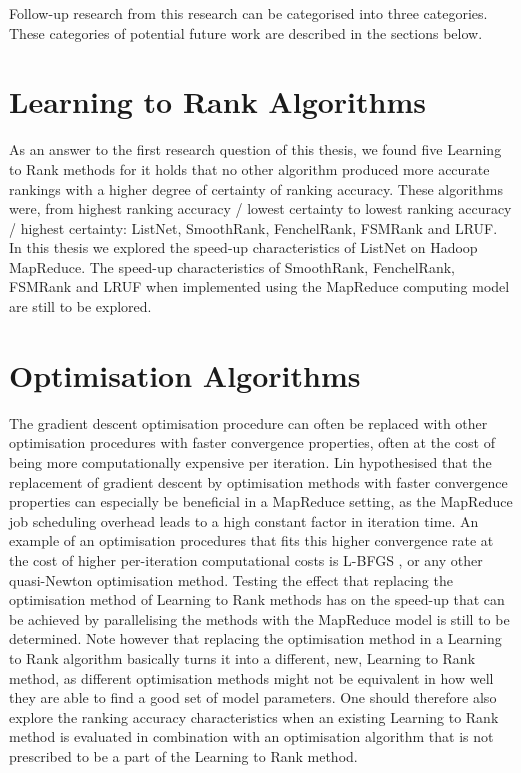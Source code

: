 Follow-up research from this research can be categorised into three categories. These categories of potential future work are described in the sections below.

\section{Learning to Rank Algorithms}
As an answer to the first research question of this thesis, we found five Learning to Rank methods for it holds that no other algorithm produced more accurate rankings with a higher degree of certainty of ranking accuracy. These algorithms were, from highest ranking accuracy / lowest certainty to lowest ranking accuracy / highest certainty: ListNet, SmoothRank, FenchelRank, FSMRank and LRUF. In this thesis we explored the speed-up characteristics of ListNet on Hadoop MapReduce. The speed-up characteristics of SmoothRank, FenchelRank, FSMRank and LRUF when implemented using the MapReduce computing model are still to be explored.

\section{Optimisation Algorithms}
The gradient descent optimisation procedure can often be replaced with other optimisation procedures with faster convergence properties, often at the cost of being more computationally expensive per iteration. Lin \cite{Lin2013} hypothesised that the replacement of gradient descent by optimisation methods with faster convergence properties can especially be beneficial in a MapReduce setting, as the MapReduce job scheduling overhead leads to a high constant factor in iteration time. An example of an optimisation procedures that fits this higher convergence rate at the cost of higher per-iteration computational costs is L-BFGS \cite{Liu1989}, or any other quasi-Newton optimisation method. Testing the effect that replacing the optimisation method of Learning to Rank methods has on the speed-up that can be achieved by parallelising the methods with the MapReduce model is still to be determined. Note however that replacing the optimisation method in a Learning to Rank algorithm basically turns it into a different, new, Learning to Rank method, as different optimisation methods might not be equivalent in how well they are able to find a good set of model parameters. One should therefore also explore the ranking accuracy characteristics when an existing Learning to Rank method is evaluated in combination with an optimisation algorithm that is not prescribed to be a part of the Learning to Rank method.

